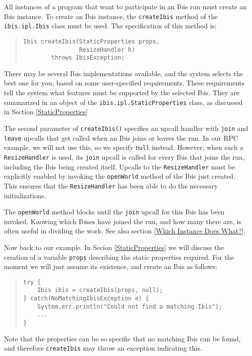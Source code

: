 \documentclass[10pt]{article}
\begin{document}
All instances of a program that want to participate in an Ibis run
must create an Ibis instance.
To create an Ibis instance, the \verb+createIbis+ method of the
\verb+ibis.ipl.Ibis+ class must be used.
The specification of this method is:
\begin{quote}
\begin{verbatim}
Ibis createIbis(StaticProperties props,
                ResizeHandler h)
        throws IbisException;
\end{verbatim}
\end{quote}
There may be several Ibis implementations available, and
the system selects the best one for you, based on some
user-specified requirements.
These requirements tell the system what features must be supported
by the selected Ibis.
They are summarized in an object of the
\verb+ibis.ipl.StaticProperties+ class, as discussed in Section
\ref{StaticProperties}

The second parameter of \verb+createIbis()+ specifies an upcall handler
with \verb+join+ and \verb+leave+ upcalls that get called when an Ibis
joins or leaves the run.  In our RPC example, we will not use this, so we
specify \verb+null+ instead.  However, when such a \verb+ResizeHandler+
is used, its \verb+join+ upcall is called for every Ibis that joins the
run, including the Ibis being created itself.
Upcalls to the \verb+ResizeHandler+ must be explicitly enabled by
invoking the \verb+openWorld+ method of the Ibis
just created. This ensures that the \verb+ResizeHandler+ has been
able to do the necessary initializations.

The \verb+openWorld+ method blocks until the
\verb+join+ upcall for this Ibis has been invoked.  Knowing which Ibises
have joined the run, and how many there are, is often useful in dividing
the work. See also section \ref{Which Instance Does What?}.

Now back to our example. In Secion \ref{StaticProperties} we will
discuss the creation of a variable \texttt{props} describing the
static properties required. For the moment we will just assume its
existence, and create an Ibis as follows:
\begin{quote}
\begin{verbatim}
try {
    Ibis ibis = createIbis(props, null);
} catch(NoMatchingIbisException e) {
    System.err.println("Could not find a matching Ibis");
    ...
}
\end{verbatim}
\end{quote}
Note that the properties can be so specific that no matching Ibis
can be found, and therefore \verb+createIbis+ may throw an exception
indicating this.
\end{document}
